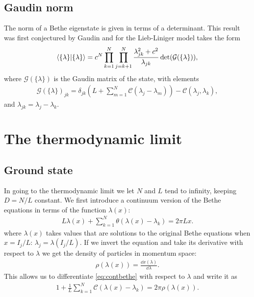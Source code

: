 \documentclass[11pt, a4paper]{report} %
\begin{document}
\subsection{Gaudin norm}
The norm of a Bethe eigenstate is given in terms of a determinant.
This result was first conjectured by Gaudin and for the Lieb-Liniger model takes the form~\cite{Caux2007}
\begin{align}
  \braket{\{\lambda\}}{\{\lambda\}} = c^N \prod_{k=1}^N \prod_{j=k+1}^N \frac{\lambda_{jk}^2 + c^2}{\lambda_{jk}} \det(\mathcal{G}(\{\lambda\})),
\end{align}
where $\mathcal{G}(\{\lambda\})$ is the Gaudin matrix of the state, with elements
\begin{align}\label{eq:gaudin}
  \mathcal{G}(\{\lambda\})_{jk} = \delta_{jk} \left(L + \sum_{m=1}^{N}\mathcal{C}(\lambda_j-\lambda_m)\right) - \mathcal{C}(\lambda_j, \lambda_k),
\end{align}
and \(\lambda_{jk} = \lambda_j-\lambda_k\).


\section{The thermodynamic limit}
\subsection{Ground state}
In going to the thermodynamic limit we let \(N\) and \(L\) tend to infinity, keeping \(D=N/L\) constant.
We first introduce a continuum version of the Bethe equations in terms of the function \(\lambda(x)\):
\begin{align}
  \label{eq:contbethe}
  L \lambda(x) + \sum_{k=1}^N\theta(\lambda(x)-\lambda_k) = 2 \pi L x.
\end{align}
where \(\lambda(x)\) takes values that are solutions to the original Bethe equations when \(x=I_j/L\): \(\lambda_j=\lambda(I_j/L)\).
If we invert the equation and take its derivative with respect to \(\lambda\) we get the density of particles in momentum space:
\begin{align}
  \rho(\lambda(x)) = \frac{\dd x(\lambda)}{\dd \lambda}.
\end{align}
This allows us to differentiate \cref{eq:contbethe} with respect to \(\lambda\) and write it as 
\begin{align}
  1+\frac{1}{L} \sum_{k=1}^{N} \mathcal{C}(\lambda(x)- \lambda_k) = 2\pi \rho(\lambda(x)).
\end{align}
\end{document}
